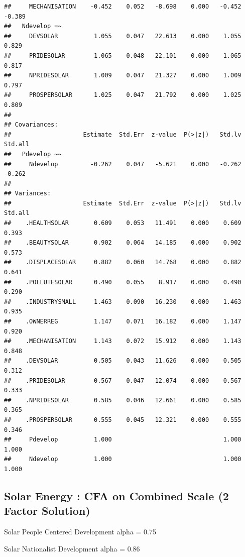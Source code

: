 \documentclass[
]{article}
\begin{document}
\begin{verbatim}
##     MECHANISATION    -0.452    0.052   -8.698    0.000   -0.452   -0.389
##   Ndevelop =~                                                           
##     DEVSOLAR          1.055    0.047   22.613    0.000    1.055    0.829
##     PRIDESOLAR        1.065    0.048   22.101    0.000    1.065    0.817
##     NPRIDESOLAR       1.009    0.047   21.327    0.000    1.009    0.797
##     PROSPERSOLAR      1.025    0.047   21.792    0.000    1.025    0.809
## 
## Covariances:
##                    Estimate  Std.Err  z-value  P(>|z|)   Std.lv  Std.all
##   Pdevelop ~~                                                           
##     Ndevelop         -0.262    0.047   -5.621    0.000   -0.262   -0.262
## 
## Variances:
##                    Estimate  Std.Err  z-value  P(>|z|)   Std.lv  Std.all
##    .HEALTHSOLAR       0.609    0.053   11.491    0.000    0.609    0.393
##    .BEAUTYSOLAR       0.902    0.064   14.185    0.000    0.902    0.573
##    .DISPLACESOLAR     0.882    0.060   14.768    0.000    0.882    0.641
##    .POLLUTESOLAR      0.490    0.055    8.917    0.000    0.490    0.290
##    .INDUSTRYSMALL     1.463    0.090   16.230    0.000    1.463    0.935
##    .OWNERREG          1.147    0.071   16.182    0.000    1.147    0.920
##    .MECHANISATION     1.143    0.072   15.912    0.000    1.143    0.848
##    .DEVSOLAR          0.505    0.043   11.626    0.000    0.505    0.312
##    .PRIDESOLAR        0.567    0.047   12.074    0.000    0.567    0.333
##    .NPRIDESOLAR       0.585    0.046   12.661    0.000    0.585    0.365
##    .PROSPERSOLAR      0.555    0.045   12.321    0.000    0.555    0.346
##     Pdevelop          1.000                               1.000    1.000
##     Ndevelop          1.000                               1.000    1.000
\end{verbatim}

\newpage

\hypertarget{solar-energy-cfa-on-combined-scale-2-factor-solution}{%
\subsection{Solar Energy : CFA on Combined Scale (2 Factor
Solution)}\label{solar-energy-cfa-on-combined-scale-2-factor-solution}}

Solar People Centered Development alpha = 0.75

Solar Nationalist Development alpha = 0.86
\end{document}
